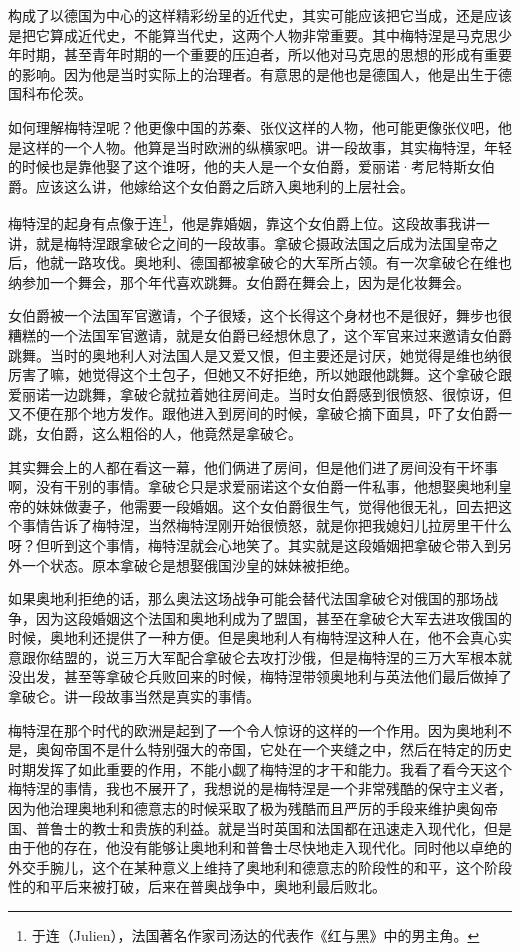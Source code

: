 \documentclass[UTF8, 12pt, a4paper]{ctexrep}
\begin{document}
构成了以德国为中心的这样精彩纷呈的近代史，其实可能应该把它当成，还是应该是把它算成近代史，不能算当代史，这两个人物非常重要。其中梅特涅是马克思少年时期，甚至青年时期的一个重要的压迫者，所以他对马克思的思想的形成有重要的影响。因为他是当时实际上的治理者。有意思的是他也是德国人，他是出生于德国科布伦茨。

如何理解梅特涅呢？他更像中国的苏秦、张仪这样的人物，他可能更像张仪吧，他是这样的一个人物。他算是当时欧洲的纵横家吧。讲一段故事，其实梅特涅，年轻的时候也是靠他娶了这个谁呀，他的夫人是一个女伯爵，爱丽诺·考尼特斯女伯爵。应该这么讲，他嫁给这个女伯爵之后跻入奥地利的上层社会。

梅特涅的起身有点像于连\footnote{于连（Julien），法国著名作家司汤达的代表作《红与黑》中的男主角。}，他是靠婚姻，靠这个女伯爵上位。这段故事我讲一讲，就是梅特涅跟拿破仑之间的一段故事。拿破仑摄政法国之后成为法国皇帝之后，他就一路攻伐。奥地利、德国都被拿破仑的大军所占领。有一次拿破仑在维也纳参加一个舞会，那个年代喜欢跳舞。女伯爵在舞会上，因为是化妆舞会。

女伯爵被一个法国军官邀请，个子很矮，这个长得这个身材也不是很好，舞步也很糟糕的一个法国军官邀请，就是女伯爵已经想休息了，这个军官来过来邀请女伯爵跳舞。当时的奥地利人对法国人是又爱又恨，但主要还是讨厌，她觉得是维也纳很厉害了嘛，她觉得这个土包子，但她又不好拒绝，所以她跟他跳舞。这个拿破仑跟爱丽诺一边跳舞，拿破仑就拉着她往房间走。当时女伯爵感到很愤怒、很惊讶，但又不便在那个地方发作。跟他进入到房间的时候，拿破仑摘下面具，吓了女伯爵一跳，女伯爵，这么粗俗的人，他竟然是拿破仑。

其实舞会上的人都在看这一幕，他们俩进了房间，但是他们进了房间没有干坏事啊，没有干别的事情。拿破仑只是求爱丽诺这个女伯爵一件私事，他想娶奥地利皇帝的妹妹做妻子，他需要一段婚姻。这个女伯爵很生气，觉得他很无礼，回去把这个事情告诉了梅特涅，当然梅特涅刚开始很愤怒，就是你把我媳妇儿拉房里干什么呀？但听到这个事情，梅特涅就会心地笑了。其实就是这段婚姻把拿破仑带入到另外一个状态。原本拿破仑是想娶俄国沙皇的妹妹被拒绝。

如果奥地利拒绝的话，那么奥法这场战争可能会替代法国拿破仑对俄国的那场战争，因为这段婚姻这个法国和奥地利成为了盟国，甚至在拿破仑大军去进攻俄国的时候，奥地利还提供了一种方便。但是奥地利人有梅特涅这种人在，他不会真心实意跟你结盟的，说三万大军配合拿破仑去攻打沙俄，但是梅特涅的三万大军根本就没出发，甚至等拿破仑兵败回来的时候，梅特涅带领奥地利与英法他们最后做掉了拿破仑。讲一段故事当然是真实的事情。

梅特涅在那个时代的欧洲是起到了一个令人惊讶的这样的一个作用。因为奥地利不是，奥匈帝国不是什么特别强大的帝国，它处在一个夹缝之中，然后在特定的历史时期发挥了如此重要的作用，不能小觑了梅特涅的才干和能力。我看了看今天这个梅特涅的事情，我也不展开了，我想说的是梅特涅是一个非常残酷的保守主义者，因为他治理奥地利和德意志的时候采取了极为残酷而且严厉的手段来维护奥匈帝国、普鲁士的教士和贵族的利益。就是当时英国和法国都在迅速走入现代化，但是由于他的存在，他没有能够让奥地利和普鲁士尽快地走入现代化。同时他以卓绝的外交手腕儿，这个在某种意义上维持了奥地利和德意志的阶段性的和平，这个阶段性的和平后来被打破，后来在普奥战争中，奥地利最后败北。
\end{document}
